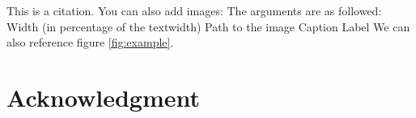 \markdownRendererInterblockSeparator
{}\lipsum[3]\markdownRendererInterblockSeparator
{}\markdownRendererInterblockSeparator
{}\lipsum[3]\markdownRendererInterblockSeparator
{}\markdownRendererInterblockSeparator
{}\lipsum[3]\markdownRendererInterblockSeparator
{}\markdownRendererInterblockSeparator
{}\lipsum[3]\markdownRendererInterblockSeparator
{}\markdownRendererInterblockSeparator
{}\lipsum[3]\markdownRendererInterblockSeparator
{}\markdownRendererInterblockSeparator
{}This is a citation.\cite{Goodfellow.2016}\markdownRendererInterblockSeparator
{}You can also add images:\markdownRendererInterblockSeparator
{}\markdownRendererInterblockSeparator
{}The arguments are as followed:\markdownRendererInterblockSeparator
{}\markdownRendererOlBeginTight
{}Width (in percentage of the textwidth)\markdownRendererOlItemEnd 
{}Path to the image\markdownRendererOlItemEnd 
{}Caption\markdownRendererOlItemEnd 
{}Label\markdownRendererOlItemEnd 
\markdownRendererOlEndTight \markdownRendererInterblockSeparator
{}We can also reference figure \ref{fig:example}.\markdownRendererInterblockSeparator
{}\section*{Acknowledgment}\markdownRendererInterblockSeparator
{}\lipsum[1]\relax
